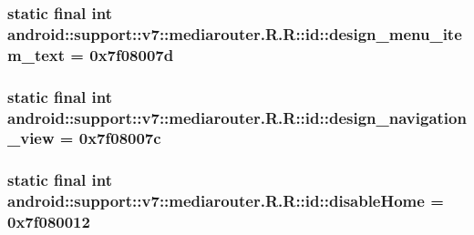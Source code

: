 \hypertarget{classandroid_1_1support_1_1v7_1_1mediarouter_1_1_r_1_1id_cd37bc81c422d664eced2ed15e2adb3e}{
\subsubsection[{design\_\-menu\_\-item\_\-text}]{\setlength{\rightskip}{0pt plus 5cm}static final int android::support::v7::mediarouter.R.R::id::design\_\-menu\_\-item\_\-text = 0x7f08007d}}
\label{classandroid_1_1support_1_1v7_1_1mediarouter_1_1_r_1_1id_cd37bc81c422d664eced2ed15e2adb3e}


\hypertarget{classandroid_1_1support_1_1v7_1_1mediarouter_1_1_r_1_1id_6ec0bbbfac93e71ec469d1af89ddc48a}{
\subsubsection[{design\_\-navigation\_\-view}]{\setlength{\rightskip}{0pt plus 5cm}static final int android::support::v7::mediarouter.R.R::id::design\_\-navigation\_\-view = 0x7f08007c}}
\label{classandroid_1_1support_1_1v7_1_1mediarouter_1_1_r_1_1id_6ec0bbbfac93e71ec469d1af89ddc48a}


\hypertarget{classandroid_1_1support_1_1v7_1_1mediarouter_1_1_r_1_1id_f503bca75b7855dfefc8a24e1c5fc65a}{
\subsubsection[{disableHome}]{\setlength{\rightskip}{0pt plus 5cm}static final int android::support::v7::mediarouter.R.R::id::disableHome = 0x7f080012}}
\label{classandroid_1_1support_1_1v7_1_1mediarouter_1_1_r_1_1id_f503bca75b7855dfefc8a24e1c5fc65a}


